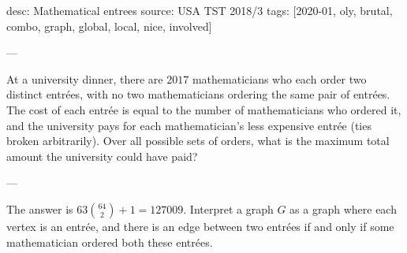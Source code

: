 desc: Mathematical entrees
source: USA TST 2018/3
tags: [2020-01, oly, brutal, combo, graph, global, local, nice, involved]

---

At a university dinner, there are $2017$ mathematicians who each order two distinct entr\'ees, with no two mathematicians ordering the same pair of entr\'ees. The cost of each entr\'ee is equal to the number of mathematicians who ordered it, and the university pays for each mathematician's less expensive entr\'ee (ties broken arbitrarily). Over all possible sets of orders, what is the maximum total amount the university could have paid?

---

The answer is $63\binom{64}2+1=127009$. Interpret a graph $G$ as a graph where each vertex is an entr\'ee, and there is an edge between two entr\'ees if and only if some mathematician ordered both these entr\'ees.

